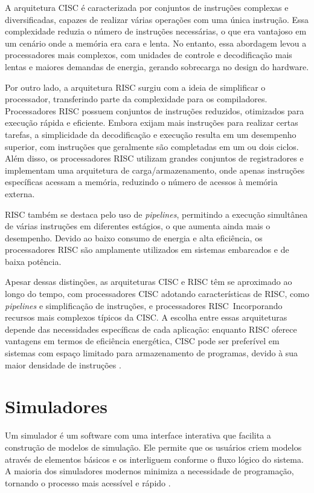 \documentclass[
	12pt,				%
	openright,			%
	oneside,			%
	a4paper,			%
	english,			%
	french,				%
	spanish,			%
	brazil,				%
	]{abntex2}
\begin{document}
A arquitetura CISC é caracterizada por conjuntos de instruções complexas e diversificadas, capazes de realizar várias operações com uma única instrução. Essa complexidade reduzia o número de instruções necessárias, o que era vantajoso em um cenário onde a memória era cara e lenta. No entanto, essa abordagem levou a processadores mais complexos, com unidades de controle e decodificação mais lentas e maiores demandas de energia, gerando sobrecarga no design do hardware.

Por outro lado, a arquitetura RISC surgiu com a ideia de simplificar o processador, transferindo parte da complexidade para os compiladores. Processadores RISC possuem conjuntos de instruções reduzidos, otimizados para execução rápida e eficiente. Embora exijam mais instruções para realizar certas tarefas, a simplicidade da decodificação e execução resulta em um desempenho superior, com instruções que geralmente são completadas em um ou dois ciclos. Além disso, os processadores RISC utilizam grandes conjuntos de registradores e implementam uma arquitetura de carga/armazenamento, onde apenas instruções específicas acessam a memória, reduzindo o número de acessos à memória externa.

RISC também se destaca pelo uso de \textit{pipelines}, permitindo a execução simultânea de várias instruções em diferentes estágios, o que aumenta ainda mais o desempenho. Devido ao baixo consumo de energia e alta eficiência, os processadores RISC são amplamente utilizados em sistemas embarcados e de baixa potência.

Apesar dessas distinções, as arquiteturas CISC e RISC têm se aproximado ao longo do tempo, com processadores CISC adotando características de RISC, como \textit{pipelines} e simplificação de instruções, e processadores RISC~Incorporando recursos mais complexos típicos da CISC. A escolha entre essas arquiteturas depende das necessidades específicas de cada aplicação: enquanto RISC oferece vantagens em termos de eficiência energética, CISC pode ser preferível em sistemas com espaço limitado para armazenamento de programas, devido à sua maior densidade de instruções \cite[p.19-21]{catsoulis_designing_2002}.

\section{Simuladores}
Um simulador é um software com uma interface interativa que facilita a construção de modelos de simulação. Ele permite que os usuários criem modelos através de elementos básicos e os interliguem conforme o fluxo lógico do sistema. A maioria dos simuladores modernos minimiza a necessidade de programação, tornando o processo mais acessível e rápido \cite{chwif_modelagem_2014}.
\end{document}
